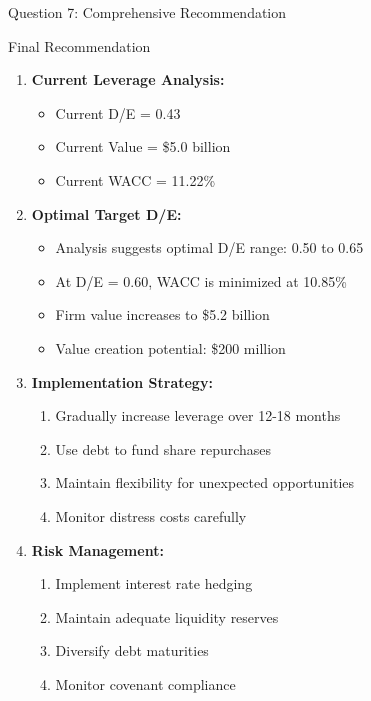 \documentclass[aspectratio=169]{beamer}
\begin{document}
	
	
	\begin{frame}{Question 7: Comprehensive Recommendation}
		\begin{block}{Final Recommendation}
			
			\begin{enumerate}
				\item \textbf{Current Leverage Analysis:}
				\begin{itemize}
					\item Current D/E = 0.43
					\item Current Value = \$5.0 billion
					\item Current WACC = 11.22\%
				\end{itemize}
				
				\item \textbf{Optimal Target D/E:}
				\begin{itemize}
					\item Analysis suggests optimal D/E range: 0.50 to 0.65
					\item At D/E = 0.60, WACC is minimized at 10.85\%
					\item Firm value increases to \$5.2 billion
					\item Value creation potential: \$200 million
				\end{itemize}
				
				\item \textbf{Implementation Strategy:}
				\begin{enumerate}
					\item Gradually increase leverage over 12-18 months
					\item Use debt to fund share repurchases
					\item Maintain flexibility for unexpected opportunities
					\item Monitor distress costs carefully
				\end{enumerate}
				
				\item \textbf{Risk Management:}
				\begin{enumerate}
					\item Implement interest rate hedging
					\item Maintain adequate liquidity reserves
					\item Diversify debt maturities
					\item Monitor covenant compliance
				\end{enumerate}
			\end{enumerate}
		\end{block}
	\end{frame}
	
\end{document}
